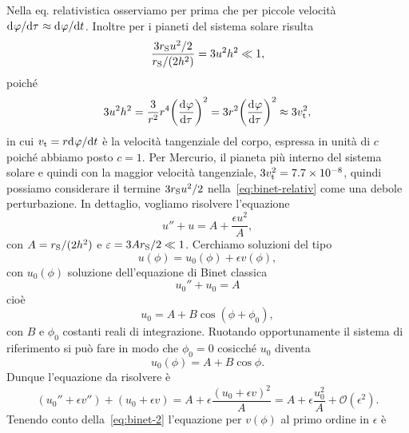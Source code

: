 Nella eq. relativistica osserviamo per prima che per piccole velocità
$\ltoder{\phi}{\tau} \approx \ltoder{\phi}{t}$.  Inoltre per i pianeti del
sistema solare risulta
\begin{equation}
  \frac{3r_{\textup{S}}u^{2}/2}{r_{\textup{S}}/(2h^{2})} = 3u^{2}h^{2} \ll 1,
\end{equation}
poiché
\begin{equation}
  3u^{2}h^{2} = \frac{3}{r^{2}}r^{4} \bigg(\toder{\phi}{\tau}\bigg)^{2} = 3r^{2}
  \bigg(\toder{\phi}{\tau}\bigg)^{2} \approx 3 v_{\textup{t}}^{2},
\end{equation}
in cui $v_{\textup{t}} = r\ltoder{\phi}{t}$ è la velocità tangenziale del corpo,
espressa in unità di $c$ poiché abbiamo posto $c = 1$.  Per Mercurio, il pianeta
più interno del sistema solare e quindi con la maggior velocità tangenziale,
$3 v_{\textup{t}}^{2} = \num{7.7e-8}$, quindi possiamo considerare il termine
$3r_{\textup{S}}u^{2}/2$ nella~\eqref{eq:binet-relativ} come una debole
perturbazione.  In dettaglio, vogliamo risolvere l'equazione
\begin{equation}
  u'' + u = A + \frac{\epsilon u^{2}}{A},
\end{equation}
con $A = r_{\textup{S}}/(2h^{2})$ e $\epsilon = 3Ar_{\textup{S}}/2  \ll 1$.
Cerchiamo soluzioni del tipo
\begin{equation}
  u(\phi) = u_{0}(\phi) + \epsilon v(\phi),
\end{equation}
con $u_{0}(\phi)$ soluzione dell'equazione di Binet classica
\begin{equation}
  \label{eq:binet-2}
  u_{0}'' + u_{0} = A
\end{equation}
cioè
\begin{equation}
  u_{0} = A + B\cos(\phi + \phi_{0}),
\end{equation}
con $B$ e $\phi_{0}$ costanti reali di integrazione.  Ruotando opportunamente il
sistema di riferimento si può fare in modo che $\phi_{0} = 0$ cosicché $u_{0}$
diventa
\begin{equation}
  \label{eq:sol-binet}
  u_{0}(\phi) = A + B\cos\phi.
\end{equation}
Dunque l'equazione da risolvere è
\begin{equation}
  (u_{0}'' + \epsilon v'') + (u_{0} + \epsilon v) = A + \epsilon \frac{(u_{0} +
    \epsilon v)^{2}}{A} = A + \epsilon \frac{u_{0}^{2}}{A} +
  \mathcal{O}(\epsilon^{2}).
\end{equation}
Tenendo conto della~\eqref{eq:binet-2} l'equazione per $v(\phi)$ al primo ordine
in $\epsilon$ è
